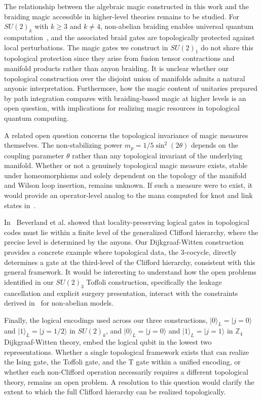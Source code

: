 \documentclass[12pt,a4paper]{article}
\def\ket#1{{|{#1}\rangle}}
\begin{document}
The relationship between the algebraic magic constructed in this work and the braiding magic accessible in higher-level theories remains to be studied. For $SU(2)_k$ with $k \geq 3$ and $k \neq 4$, non-abelian braiding enables universal quantum computation~\cite{Freedman2003,Nayak2008}, and the associated braid gates are topologically protected against local perturbations. The magic gates we construct in $SU(2)_1$ do not share this topological protection since they arise from fusion tensor contractions and manifold products rather than anyon braiding. It is unclear whether our topological construction over the disjoint union of manifolds admits a natural anyonic interpretation. Furthermore, how the magic content of unitaries prepared by path integration compares with braiding-based magic at higher levels is an open question, with implications for realizing magic resources in topological quantum computing.

A related open question concerns the topological invariance of magic measures themselves. The non-stabilizing power $m_p = 1/5\sin^2(2\theta)$ depends on the coupling parameter $\theta$ rather than any topological invariant of the underlying manifold. Whether or not a genuinely topological magic measure exists, stable under homeomorphisms and solely dependent on the topology of the manifold and Wilson loop insertion, remains unknown. If such a measure were to exist, it would provide an operator-level analog to the mana computed for knot and link states in~\cite{Fliss:2021}.

In~\cite{Beverland2016} Beverland et al. showed that locality-preserving logical gates in topological codes must lie within a finite level of the generalized Clifford hierarchy, where the precise level is determined by the anyons. Our Dijkgraaf-Witten construction provides a concrete example where topological data, the 3-cocycle, directly determines a gate at the third-level of the Clifford hierarchy, consistent with this general framework. It would be interesting to understand how the open problems identified in our $SU(2)_3$ Toffoli construction, specifically the leakage cancellation and explicit surgery presentation, interact with the constraints derived in~\cite{Beverland2016} for non-abelian models.

Finally, the logical encodings used across our three constructions, $\ket{0}_L = \ket{j=0}$ and $\ket{1}_L = \ket{j=1/2}$ in $SU(2)_k$, and $\ket{0}_L = \ket{j=0}$ and $\ket{1}_L = \ket{j=1}$ in $\mathbb{Z}_4$ Dijkgraaf-Witten theory, embed the logical qubit in the lowest two representations. Whether a single topological framework exists that can realize the Ising gate, the Toffoli gate, and the T gate within a unified encoding, or whether each non-Clifford operation necessarily requires a different topological theory, remains an open problem. A resolution to this question would clarify the extent to which the full Clifford hierarchy can be realized topologically.
\end{document}
